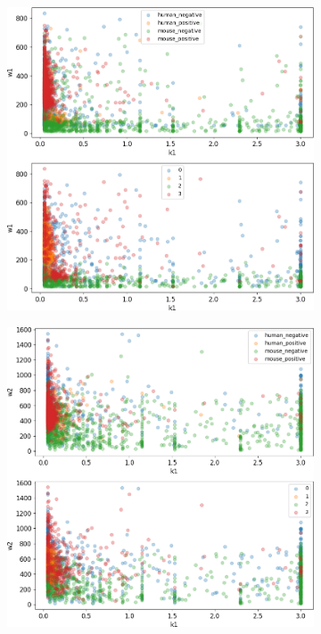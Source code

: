 \begin{figure}
	\begin{subfigure}{0.49\textwidth}
		\includegraphics[width=\textwidth]{fig/seperate_k1_w1}
	\end{subfigure}
	\hfill
	\begin{subfigure}{0.49\textwidth}
		\includegraphics[width=\textwidth]{fig/seperate_k1_w2}

\end{subfigure}
\end{figure}
